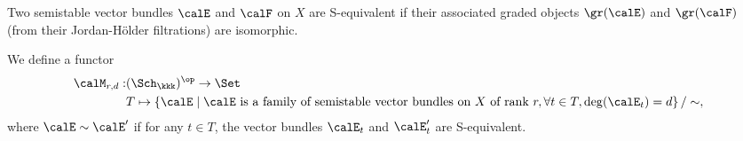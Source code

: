     \begin{definition}[S-equivalence]\label{def:S-equivalence}
        Two semistable vector bundles \(\calE\) and \(\calF\) on \(X\) are S-equivalent if their associated graded objects \(\gr(\calE)\) and \(\gr(\calF)\) (from their Jordan-H\"older filtrations) are isomorphic.
    \end{definition}


    \begin{definition}\label{def:coarse_moduli_functor_of_vector_bundles}
        We define a functor 
        \begin{align*}
            \calM_{r,d} : & (\Sch_\kkk)^{\op} \to \Set \\
            & T \mapsto \left\{ 
                \calE 
            \;\middle|\;
                \calE \text{ is a family of semistable vector bundles on } X \text{ of rank } r, \forall t \in T, \deg(\calE_t) = d
            \right\}/ \sim,
        \end{align*}
        where \(\calE \sim \calE'\) if for any \(t \in T\), the vector bundles \(\calE_t\) and \(\calE'_t\) are S-equivalent.
    \end{definition}